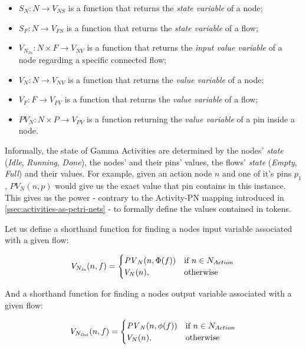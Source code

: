 \begin{itemize}
	\item \(S_N : N \rightarrow V_\mathit{NS} \) is a function that returns the \emph{state variable} of a node;
	\item \(S_F : N \rightarrow V_\mathit{FS} \) is a function that returns the \emph{state variable} of a flow;
	\item \(V_{N_\mathit{In}} : N \times F \rightarrow V_\mathit{NV} \) is a function that returns the \emph{input value variable} of a node regarding a specific connected flow;
	\item \(V_N : N \rightarrow V_\mathit{NV} \) is a function that returns the \emph{value variable} of a node;
	\item \(V_F : F \rightarrow V_\mathit{FV} \) is a function that returns the \emph{value variable} of a flow;
	\item \(\mathit{PV}_N : N \times P \rightarrow V_\mathit{PV} \) is a function returning the \emph{value variable} of a pin inside a node.
\end{itemize}

Informally, the state of Gamma Activities are determined by the nodes' \emph{state} (\emph{Idle}, \emph{Running}, \emph{Done}), the nodes' and their pins' values, the flows' \emph{state} (\emph{Empty}, \emph{Full}) and their values. For example, given an action node \(n\) and one of it's pins \(p_1\), \(\mathit{PV}_N(n, p)\) would give us the exact value that pin contains in this instance. This gives us the power - contrary to the Activity-PN mapping introduced in \autoref{ssec:activities-as-petri-nets} - to formally define the values contained in tokens.

Let us define a shorthand function for finding a nodes input variable associated with a given flow:

\begin{equation*}
	V_{N_\mathit{In}}(n, f) = 
	\begin{cases}
		\mathit{PV}_N(n, \Phi(f)) & \text{if } n \in N_{Action} \\
		V_N(n), & \text{otherwise}
	\end{cases}
\end{equation*}

And a shorthand function for finding a nodes output variable associated with a given flow:

\begin{equation*}
	V_{N_\mathit{Out}}(n, f) = 
	\begin{cases}
		\mathit{PV}_N(n, \phi(f)) & \text{if } n \in N_{Action} \\
		V_N(n), & \text{otherwise}
	\end{cases}
\end{equation*}

